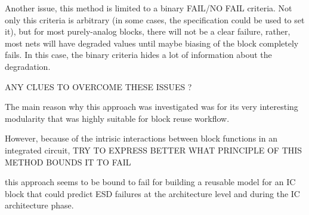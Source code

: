 Another issue, this method is limited to a binary FAIL/NO FAIL criteria.
Not only this criteria is arbitrary (in some cases, the specification could be used to set it), but
for most purely-analog blocks, there will not be a clear failure, rather, most
nets will have degraded values until maybe biasing of the block completely fails.
In this case, the binary criteria hides a lot of information about the degradation.

ANY CLUES TO OVERCOME THESE ISSUES ?

The main reason why this approach was investigated was for its very interesting modularity
that was highly suitable for block reuse workflow.

However, because of the intrisic interactions between block functions in an integrated circuit,
TRY TO EXPRESS BETTER WHAT PRINCIPLE OF THIS METHOD BOUNDS IT TO FAIL

this approach seems to be bound to fail for building a reusable model for an IC block that could predict
ESD failures at the architecture level and during the IC architecture phase.
